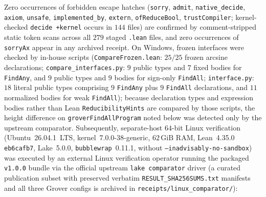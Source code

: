 \documentclass[11pt,a4paper]{article}
\theoremstyle{definition}
\theoremstyle{remark}
\begin{document}
Zero occurrences of forbidden escape hatches (\texttt{sorry}, \texttt{admit}, \texttt{native\_decide}, \texttt{axiom}, \texttt{unsafe}, \texttt{implemented\_by}, \texttt{extern}, \texttt{ofReduceBool}, \texttt{trustCompiler}; kernel-checked \texttt{decide +kernel} occurs in \(144\) files) are confirmed by comment-stripped static token scans across all \(279\) staged \texttt{.lean} files, and zero occurrences of \texttt{sorryAx} appear in any archived receipt. On Windows, frozen interfaces were checked by in-house scripts (\texttt{Compare\allowbreak Frozen.lean}: \(25/25\) frozen arcsine declarations; \texttt{compare\_\allowbreak interfaces.py}: \(9\) public types and \(7\) fixed bodies for \texttt{FindAny}, and \(9\) public types and \(9\) bodies for sign-only \texttt{FindAll}; \texttt{interface.py}: \(18\) literal public types comprising \(9\) \texttt{FindAny} plus \(9\) \texttt{FindAll} declarations, and \(11\) normalized bodies for weak \texttt{FindAll}); because declaration types and expression bodies rather than Lean \texttt{Reducibility\allowbreak Hints} are compared by those scripts, the height difference on \texttt{groverFindAll\allowbreak Program} noted below was detected only by the upstream comparator. Subsequently, separate-host \(64\)-bit Linux verification (Ubuntu~26.04.1~LTS, kernel~7.0.0-38-generic, \(62\,\mathrm{GiB}\) RAM, Lean~4.35.0 \texttt{eb6cafb7}, Lake~5.0.0, \texttt{bubblewrap}~0.11.1, without \texttt{--inadvisably-no-sandbox}) was executed by an external Linux verification operator running the packaged \texttt{v1.0.0} bundle via the official upstream \texttt{lake comparator} driver \cite{comparator2026} (a curated publication subset with preserved verbatim \texttt{RESULT\_SHA256SUMS.txt} manifests and all three Grover configs is archived in \texttt{receipts/\allowbreak linux\_\allowbreak comparator/}):
\end{document}
